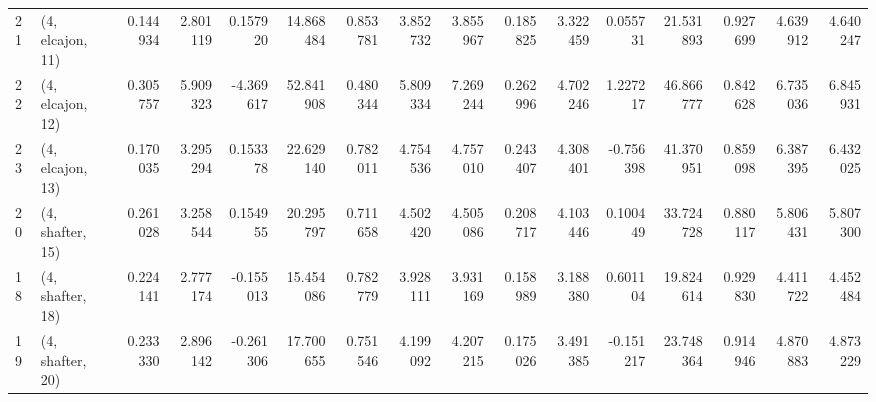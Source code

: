 \begin{tabular}{llrrrrrrrrrrrrrr}
21 &  (4, elcajon, 11) &   0.144934 &  2.801119 &  0.157920 &  14.868484 &  0.853781 &   3.852732 &  3.855967 &  0.185825 &  3.322459 &  0.055731 &   21.531893 &  0.927699 &   4.639912 &   4.640247 \\
22 &  (4, elcajon, 12) &   0.305757 &  5.909323 & -4.369617 &  52.841908 &  0.480344 &   5.809334 &  7.269244 &  0.262996 &  4.702246 &  1.227217 &   46.866777 &  0.842628 &   6.735036 &   6.845931 \\
23 &  (4, elcajon, 13) &   0.170035 &  3.295294 &  0.153378 &  22.629140 &  0.782011 &   4.754536 &  4.757010 &  0.243407 &  4.308401 & -0.756398 &   41.370951 &  0.859098 &   6.387395 &   6.432025 \\
20 &  (4, shafter, 15) &   0.261028 &  3.258544 &  0.154955 &  20.295797 &  0.711658 &   4.502420 &  4.505086 &  0.208717 &  4.103446 &  0.100449 &   33.724728 &  0.880117 &   5.806431 &   5.807300 \\
18 &  (4, shafter, 18) &   0.224141 &  2.777174 & -0.155013 &  15.454086 &  0.782779 &   3.928111 &  3.931169 &  0.158989 &  3.188380 &  0.601104 &   19.824614 &  0.929830 &   4.411722 &   4.452484 \\
19 &  (4, shafter, 20) &   0.233330 &  2.896142 & -0.261306 &  17.700655 &  0.751546 &   4.199092 &  4.207215 &  0.175026 &  3.491385 & -0.151217 &   23.748364 &  0.914946 &   4.870883 &   4.873229 \\
\bottomrule
\end{tabular}
